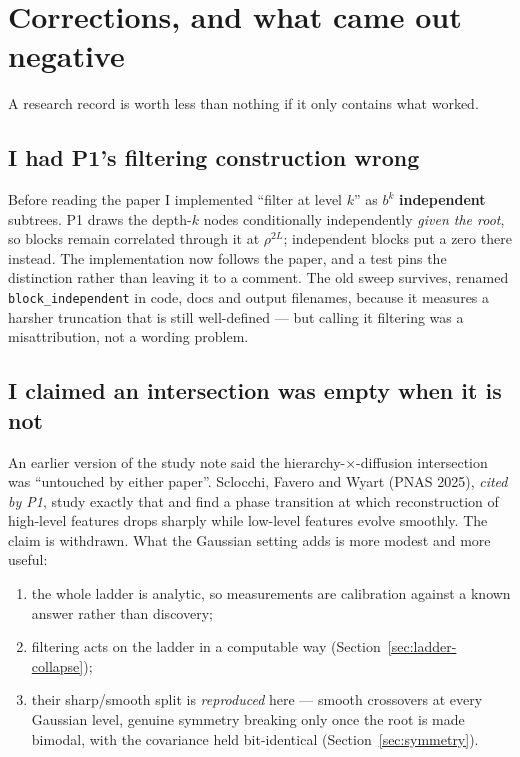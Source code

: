 \documentclass[11pt]{article}
\theoremstyle{remark}
\newcommand{\code}[1]{\texttt{\small #1}}
\begin{document}
\section{Corrections, and what came out negative}
\label{sec:corrections}

A research record is worth less than nothing if it only contains what worked.

\subsection{I had P1's filtering construction wrong}
\label{sec:correction-filtering}

Before reading the paper I implemented ``filter at level $k$'' as $b^k$
\textbf{independent} subtrees. P1 draws the depth-$k$ nodes conditionally
independently \emph{given the root}, so blocks remain correlated through it at
$\rho^{2L}$; independent blocks put a zero there instead. The implementation now
follows the paper, and a test pins the distinction rather than leaving it to a
comment. The old sweep survives, renamed \code{block\_independent} in code,
docs and output filenames, because it measures a harsher truncation that is
still well-defined --- but calling it filtering was a misattribution, not a
wording problem.

\subsection{I claimed an intersection was empty when it is not}
\label{sec:novelty}

An earlier version of the study note said the hierarchy-$\times$-diffusion
intersection was ``untouched by either paper''. Sclocchi, Favero and Wyart (PNAS
2025), \emph{cited by P1}, study exactly that and find a phase transition at
which reconstruction of high-level features drops sharply while low-level
features evolve smoothly. The claim is withdrawn. What the Gaussian setting adds
is more modest and more useful:
\begin{enumerate}[nosep]
  \item the whole ladder is analytic, so measurements are calibration against a
    known answer rather than discovery;
  \item filtering acts on the ladder in a computable way
    (Section~\ref{sec:ladder-collapse});
  \item their sharp/smooth split is \emph{reproduced} here --- smooth crossovers
    at every Gaussian level, genuine symmetry breaking only once the root is
    made bimodal, with the covariance held bit-identical
    (Section~\ref{sec:symmetry}).
\end{enumerate}
\end{document}
